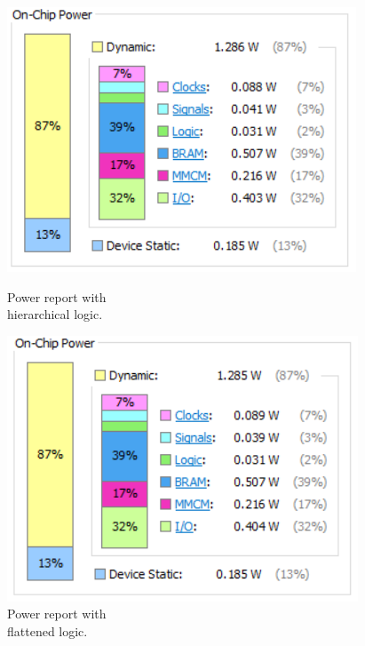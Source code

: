 \begin{figure}[H]
	\centering
	\begin{minipage}{.5\textwidth}
		\centering
		\includegraphics[width=.9\linewidth]{IMG/ch4/FirmwareNOFLAT/POWER}
		\caption{Power report with \\hierarchical logic.}
		\label{fig:noflatpower}
	\end{minipage}%
	\begin{minipage}{.5\textwidth}
		\centering
		\includegraphics[width=.9\linewidth]{IMG/ch4/FirmwareFLAT/POWER}
		\caption{Power report with \\flattened logic.}
		\label{fig:flatpower}
	\end{minipage}
\end{figure}
